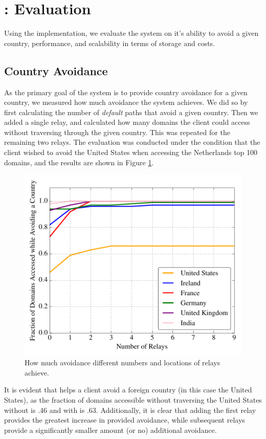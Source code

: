 \section{\system{}: Evaluation}
Using the \system{} implementation, we evaluate the system on it's ability to avoid a given country, performance, and scalability in terms of storage and costs.

\subsection{Country Avoidance}
As the primary goal of the system is to provide country avoidance for a given 
country, we measured how much avoidance the system achieves.  We did so by first 
calculating the number of {\it default} paths that avoid a given country.  Then 
we added a single relay, and calculated how many domains the client could 
access without traversing through the given country.  This was repeated for 
the remaining two relays.  The evaluation was conducted under the condition that 
the client wished to avoid the United States when accessing the Netherlands top 
100 domains, and the results are shown in Figure \ref{fig:avoidance_eval}.

\begin{figure}[b!]
\centering
\includegraphics[width=.5\textwidth]{avoidance_n_relays}
\caption{How much avoidance different numbers and locations of relays achieve.}
\label{fig:avoidance_eval}
\end{figure}

It is evident that \system{} helps a client avoid a foreign country (in this case 
the United States), as the fraction of domains accessible without traversing 
the United States without \system{} is .46 and with \system{} is .63.  Additionally, 
it is clear that adding the first relay provides the greatest increase in 
provided avoidance, while subsequent relays provide a significantly 
smaller amount (or no) additional avoidance.

